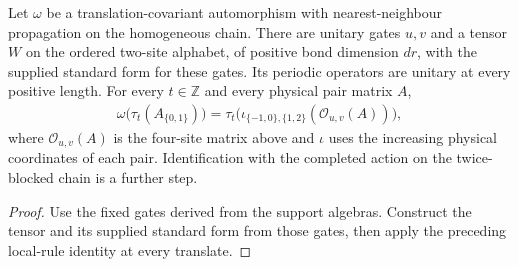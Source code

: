 \begin{lemma}
    \label{lem:qca_constructed_tensor_actual_local_rule}
    \leanok
    Let $\omega$ be a translation-covariant automorphism with
    nearest-neighbour propagation on the homogeneous chain. There are
    unitary gates $u,v$ and a tensor $W$ on the ordered two-site alphabet,
    of positive bond dimension $dr$, with the supplied standard form for
    these gates. Its periodic operators are unitary at every positive
    length. For every $t\in\mathbb Z$ and every physical pair matrix $A$,
    \begin{align}
        \omega\bigl(\tau_t(A_{\{0,1\}})\bigr)
        =\tau_t\bigl(\iota_{\{-1,0\},\{1,2\}}
        (\mathcal O_{u,v}(A))\bigr),
    \end{align}
    where $\mathcal O_{u,v}(A)$ is the four-site matrix above and $\iota$
    uses the increasing physical coordinates of each pair. Identification
    with the completed action on the twice-blocked chain is a further step.
\end{lemma}
\begin{proof}
    \leanok
    Use the fixed gates derived from the support algebras. Construct the
    tensor and its supplied standard form from those gates, then apply
    the preceding local-rule identity at every translate.
\end{proof}
